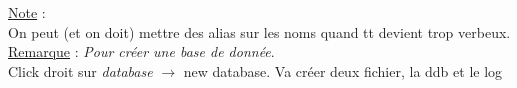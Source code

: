 \documentclass[a4paper,12pt,twoside]{article}
\newcommand{\rem}[2]{\noindent\underline{Remarque} : \textit{#1}.\\ \indent #2}
\newcommand{\note}[1]{\noindent\underline{Note} : \\ \indent #1}
\begin{document}
\note{On peut (et on doit) mettre des alias sur les noms quand tt devient trop verbeux.}\\

\rem{Pour créer une base de donnée}{Click droit sur \textit{database} $\to$ {new database}. Va créer deux fichier, la ddb et le log}

\newpage
\printglossary[type=\acronymtype]%
\glsaddallunused %
\printglossary[type = main,nonumberlist]%
\end{document}
